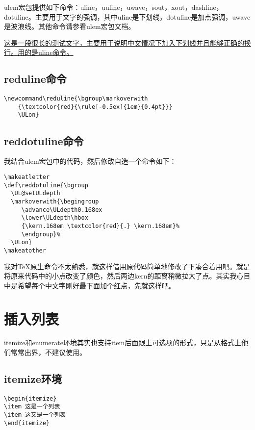 ulem宏包提供如下命令：uline，uuline，uwave，sout，xout，dashline，dotuline。主要用于文字的强调，其中uline是下划线，dotuline是加点强调，uwave是波浪线。其他命令请参看ulem宏包文档。

\uline{这是一段很长的测试文字，主要用于说明中文情况下加入下划线并且能够正确的换行。用的是uline命令。}


\subsection{reduline命令}
\begin{verbatim}
\newcommand\reduline{\bgroup\markoverwith
	{\textcolor{red}{\rule[-0.5ex]{1em}{0.4pt}}}
	\ULon}
\end{verbatim}


\subsection{reddotuline命令}
我结合ulem宏包中的代码，然后修改自造一个命令如下：
\begin{verbatim}
\makeatletter
\def\reddotuline{\bgroup 
  \UL@setULdepth
  \markoverwith{\begingroup
     \advance\ULdepth0.168ex 
     \lower\ULdepth\hbox
     {\kern.168em \textcolor{red}{.} \kern.168em}%
     \endgroup}%
  \ULon}
\makeatother
\end{verbatim}

我对\TeX 原生命令不太熟悉，就这样借用原代码简单地修改了下凑合着用吧。就是将原来代码中的小点改变了颜色，然后两边kern的距离稍微拉大了点。其实我心目中是希望每个中文字刚好最下面加个红点，先就这样吧。


\section{插入列表}
itemize和enumerate环境其实也支持item后面跟上可选项的形式，只是从格式上他们常常出界，不建议使用。
\subsection{itemize环境}
\begin{verbatim}
\begin{itemize}
\item 这是一个列表
\item 这又是一个列表
\end{itemize}
\end{verbatim}


